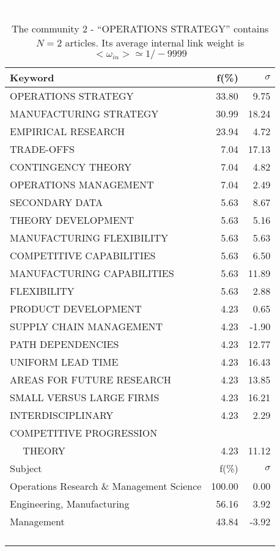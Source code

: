 \documentclass[a4paper,11pt]{report}
\begin{document}
\begin{landscape}
\clearpage

\begin{table}[!ht]
\caption{The community 2 - ``OPERATIONS STRATEGY'' contains $N = 2$ articles. Its average internal link weight is $<\omega_{in}> \simeq 1/-9999$ }
\textcolor{white}{aa}\\
{\scriptsize\begin{tabular}{|l r r|}
\hline
Keyword & f(\%) & $\sigma$\\
\hline
OPERATIONS STRATEGY & 33.80 & 9.75\\
MANUFACTURING STRATEGY & 30.99 & 18.24\\
EMPIRICAL RESEARCH & 23.94 & 4.72\\
TRADE-OFFS & 7.04 & 17.13\\
CONTINGENCY THEORY & 7.04 & 4.82\\
OPERATIONS MANAGEMENT & 7.04 & 2.49\\
SECONDARY DATA & 5.63 & 8.67\\
THEORY DEVELOPMENT & 5.63 & 5.16\\
MANUFACTURING FLEXIBILITY & 5.63 & 5.63\\
COMPETITIVE CAPABILITIES & 5.63 & 6.50\\
MANUFACTURING CAPABILITIES & 5.63 & 11.89\\
FLEXIBILITY & 5.63 & 2.88\\
PRODUCT DEVELOPMENT & 4.23 & 0.65\\
SUPPLY CHAIN MANAGEMENT & 4.23 & -1.90\\
PATH DEPENDENCIES & 4.23 & 12.77\\
UNIFORM LEAD TIME & 4.23 & 16.43\\
AREAS FOR FUTURE RESEARCH & 4.23 & 13.85\\
SMALL VERSUS LARGE FIRMS & 4.23 & 16.21\\
INTERDISCIPLINARY & 4.23 & 2.29\\
COMPETITIVE PROGRESSION &  & \\
$\quad$ THEORY & 4.23 & 11.12\\
\hline
\hline
Subject & f(\%) & $\sigma$\\
\hline
Operations Research \& Management Science & 100.00 & 0.00\\
Engineering, Manufacturing & 56.16 & 3.92\\
Management & 43.84 & -3.92\\
 &  & \\
 &  & \\
 &  & \\
 &  & \\

\end{tabular}}
\end{table}
\end{landscape}
\end{document}
